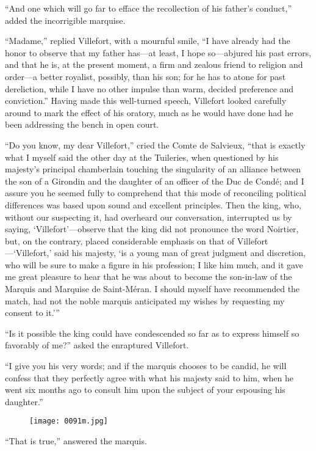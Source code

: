 “And one which will go far to efface the recollection of his father’s
conduct,” added the incorrigible marquise.

“Madame,” replied Villefort, with a mournful smile, “I have already had
the honor to observe that my father has—at least, I hope so—abjured his
past errors, and that he is, at the present moment, a firm and zealous
friend to religion and order—a better royalist, possibly, than his son;
for he has to atone for past dereliction, while I have no other impulse
than warm, decided preference and conviction.” Having made this
well-turned speech, Villefort looked carefully around to mark the
effect of his oratory, much as he would have done had he been
addressing the bench in open court.

“Do you know, my dear Villefort,” cried the Comte de Salvieux, “that is
exactly what I myself said the other day at the Tuileries, when
questioned by his majesty’s principal chamberlain touching the
singularity of an alliance between the son of a Girondin and the
daughter of an officer of the Duc de Condé; and I assure you he seemed
fully to comprehend that this mode of reconciling political differences
was based upon sound and excellent principles. Then the king, who,
without our suspecting it, had overheard our conversation, interrupted
us by saying, ‘Villefort’—observe that the king did not pronounce the
word Noirtier, but, on the contrary, placed considerable emphasis on
that of Villefort—‘Villefort,’ said his majesty, ‘is a young man of
great judgment and discretion, who will be sure to make a figure in his
profession; I like him much, and it gave me great pleasure to hear that
he was about to become the son-in-law of the Marquis and Marquise de
Saint-Méran. I should myself have recommended the match, had not the
noble marquis anticipated my wishes by requesting my consent to it.’”

“Is it possible the king could have condescended so far as to express
himself so favorably of me?” asked the enraptured Villefort.

“I give you his very words; and if the marquis chooses to be candid, he
will confess that they perfectly agree with what his majesty said to
him, when he went six months ago to consult him upon the subject of
your espousing his daughter.”

\begin{figure}[h]
\texttt{[image: 0091m.jpg]}
\end{figure}

“That is true,” answered the marquis.

